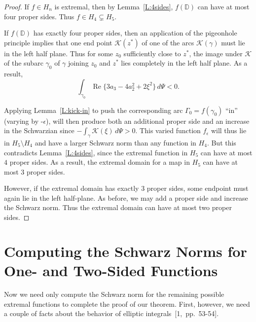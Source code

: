 \documentclass{lms}
\newcommand{\D}{\mathbb D}
\newcommand{\K}{\mathcal K}
\DeclareMathOperator{\re}{Re}
\numberwithin{equation}{section}
\begin{document}
\begin{proof}

If $f\in H_n$ is extremal, then by Lemma~\ref{L:4sides}, $f(\D)$ can 
have at most four proper sides. Thus $f\in H_4\subsetneq H_5$.

 If $f(\D)$ has exactly four proper sides,
then an application of the pigeonhole principle implies that
one end point $\K(z^*)$
of one of the arcs $\K (\gamma)$ must lie in the left half plane.
Thus
for some $z_0$ sufficiently close to $z^*$, the image under $\K$ of the 
subarc $\gamma_0$ of $\gamma$ joining $z_0$ and $z^*$ lies completely in the 
left half plane.  As
a result,
\[
\int_{\gamma_0} \re \{3a_3 - 4a_2^2 + 2\xi^2 \} \,d\Psi < 0.
\]

Applying Lemma~\ref{L:kick-in} to push
 the corresponding arc $\Gamma_0=f(\gamma_0)$ ``in'' (varying by
 -$\epsilon$),
 will then produce both an additional proper side and 
an increase in the Schwarzian since $-\int_\gamma \K(\xi)\, d\Psi >0$.
  This varied function $f_\epsilon$ will
thus lie in $H_5\setminus H_4$ and have a larger Schwarz norm than any
function in $H_4$.  But this contradicts Lemma~\ref{L:4sides},
since the extremal function in $H_5$ can have at most
$4$ proper sides.
As a result, the extremal domain for a map in $H_5$ can have at most $3$ 
proper sides.



However, if the extremal domain has exactly 3 proper
sides, some endpoint must again lie
in the left half-plane.  As before, we may add a proper side and
increase the Schwarz norm.  Thus the extremal domain can have at most
two proper sides.


\end{proof}





\section{Computing the Schwarz Norms for One- 
and Two-Sided Functions}\label{S:compute}

Now we need only compute the Schwarz norm for the remaining possible 
extremal functions to complete the proof of our theorem. First, however,
 we need a couple of facts about the behavior of 
elliptic integrals~[1,~pp.~53-54].
\end{document}
